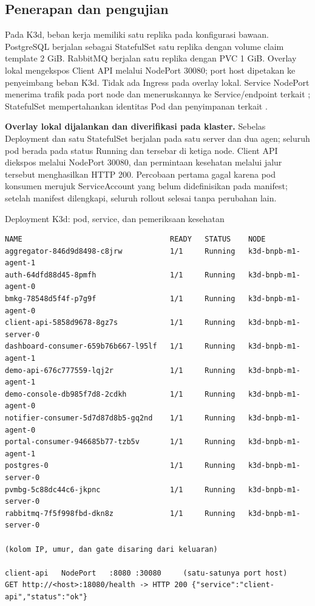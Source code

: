 \documentclass{fairmeta}
\begin{document}
\subsection{Penerapan dan pengujian}

Pada K3d, beban kerja memiliki satu replika pada konfigurasi bawaan. PostgreSQL berjalan sebagai StatefulSet satu replika dengan volume claim template 2 GiB. RabbitMQ berjalan satu replika dengan PVC 1 GiB. Overlay lokal mengekspos Client API melalui NodePort 30080; port host dipetakan ke penyeimbang beban K3d. Tidak ada Ingress pada overlay lokal. Service NodePort menerima trafik pada port node dan meneruskannya ke Service/endpoint terkait \cite{kubernetes-service}; StatefulSet mempertahankan identitas Pod dan penyimpanan terkait \cite{kubernetes-statefulset}.

\textbf{Overlay lokal dijalankan dan diverifikasi pada klaster.} Sebelas Deployment dan satu StatefulSet berjalan pada satu server dan dua agen; seluruh pod berada pada status Running dan tersebar di ketiga node. Client API diekspos melalui NodePort 30080, dan permintaan kesehatan melalui jalur tersebut menghasilkan HTTP 200. Percobaan pertama gagal karena pod konsumen merujuk ServiceAccount yang belum didefinisikan pada manifest; setelah manifest dilengkapi, seluruh rollout selesai tanpa perubahan lain.

\begin{evidencebox}{Deployment K3d: pod, service, dan pemeriksaan kesehatan}
\begin{lstlisting}
NAME                                  READY   STATUS    NODE
aggregator-846d9d8498-c8jrw           1/1     Running   k3d-bnpb-m1-agent-1
auth-64dfd88d45-8pmfh                 1/1     Running   k3d-bnpb-m1-agent-0
bmkg-78548d5f4f-p7g9f                 1/1     Running   k3d-bnpb-m1-agent-0
client-api-5858d9678-8gz7s            1/1     Running   k3d-bnpb-m1-server-0
dashboard-consumer-659b76b667-l95lf   1/1     Running   k3d-bnpb-m1-agent-1
demo-api-676c777559-lqj2r             1/1     Running   k3d-bnpb-m1-agent-1
demo-console-db985f7d8-2cdkh          1/1     Running   k3d-bnpb-m1-agent-0
notifier-consumer-5d7d87d8b5-gq2nd    1/1     Running   k3d-bnpb-m1-agent-0
portal-consumer-946685b77-tzb5v       1/1     Running   k3d-bnpb-m1-agent-1
postgres-0                            1/1     Running   k3d-bnpb-m1-server-0
pvmbg-5c88dc44c6-jkpnc                1/1     Running   k3d-bnpb-m1-server-0
rabbitmq-7f5f998fbd-dkn8z             1/1     Running   k3d-bnpb-m1-server-0

(kolom IP, umur, dan gate disaring dari keluaran)

client-api   NodePort   :8080 :30080     (satu-satunya port host)
GET http://<host>:18080/health -> HTTP 200 {"service":"client-api","status":"ok"}
\end{lstlisting}
\end{evidencebox}
\end{document}
